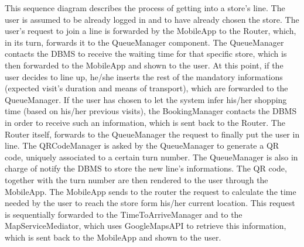 \documentclass{article}
\begin{document}
\noindent This sequence diagram describes the process of getting into a store’s line. The user is assumed to be already logged in and to have already chosen the store. The user’s request to join a line is forwarded by the MobileApp to the Router, which, in its turn, forwards it to the QueueManager component. The QueueManager contacts the DBMS to receive the waiting time for that specific store, which is then forwarded to the MobileApp and shown to the user. At this point, if the user decides to line up, he/she inserts the rest of the mandatory informations (expected visit’s duration and means of transport), which are forwarded to the QueueManager. If the user has chosen to let the system infer his/her shopping time (based on his/her previous visits), the BookingManager contacts the DBMS in order to receive such an information, which is sent back to the Router. The Router itself, forwards to the QueueManager the request to finally put the user in line. The QRCodeManager is asked by the QueueManager to generate a QR code, uniquely associated to a certain turn number. The QueueManager is also in charge of notify the DBMS to store the new line’s informations. The QR code, together with the turn number are then rendered to the user through the MobileApp. The MobileApp sends to the router the request to calculate the time needed by the user to reach the store form his/her current location. This request is sequentially forwarded to the TimeToArriveManager and to the MapServiceMediator, which uses GoogleMapsAPI to retrieve this information, which is sent back to the MobileApp and shown to the user.
\end{document}
